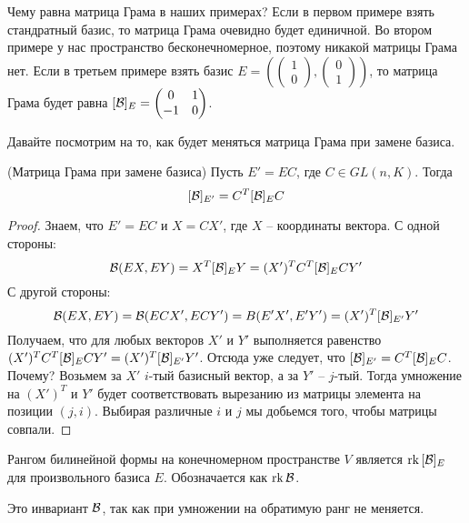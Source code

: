     \vspace*{5mm}
    
    Чему равна матрица Грама в наших примерах?
    Если в первом примере взять стандратный базис, то матрица Грама очевидно будет единичной.
    Во втором примере у нас пространство бесконечномерное, поэтому никакой матрицы Грама нет. 
    Если в третьем примере взять базис $E = \left(\begin{pmatrix}
        1 \\ 0
    \end{pmatrix}, \begin{pmatrix}
        0 \\ 1
    \end{pmatrix} \right)$, то матрица Грама будет равна $[\mathcal{B}]_E = \begin{pmatrix}
        0 & 1 \\
        -1 & 0
    \end{pmatrix}$.
    
    \vspace*{5mm}
    
    Давайте посмотрим на то, как будет меняться матрица Грама при замене базиса.
    
    \begin{theorem}(Матрица Грама при замене базиса)
        Пусть $E' = EC$, где $C \in GL(n, K)$.
        Тогда \[ [\mathcal{B}]_{E'} = C^T[\mathcal{B}]_EC \]
    \end{theorem}
    \begin{proof}
        Знаем, что $E' = EC$ и $X = CX'$, где $X$ -- координаты вектора.
        С одной стороны: \[ \mathcal{B}(EX, EY) = X^T[\mathcal{B}]_EY = (X')^TC^T[\mathcal{B}]_ECY' \]
        \quad С другой стороны: \[ \mathcal{B}(EX, EY) = \mathcal{B}(ECX', ECY') = B(E'X', E'Y') = (X')^T[\mathcal{B}]_{E'}Y' \]
        \quad Получаем, что для любых векторов $X'$ и $Y'$ выполняется равенство $(X')^TC^T[\mathcal{B}]_ECY' = (X')^T[\mathcal{B}]_{E'}Y'$.
        Отсюда уже следует, что $[\mathcal{B}]_{E'} = C^T[\mathcal{B}]_EC$.
        Почему?
        Возьмем за $X'$ $i$-тый базисный вектор, а за $Y'$ -- $j$-тый.
        Тогда умножение на $(X')^T$ и $Y'$ будет соответствовать вырезанию из матрицы элемента на позиции $(j, i)$.
        Выбирая различные $i$ и $j$ мы добьемся того, чтобы матрицы совпали.
    \end{proof}
    
    \vspace*{5mm}
    
    \begin{conj}
        Рангом билинейной формы на конечномерном пространстве $V$ является $\operatorname{rk}{[\mathcal{B}]_E}$ для произвольного базиса $E$.
        Обозначается как $\operatorname{rk}{\mathcal{B}}$.
    \end{conj}
    
    \notice Это инвариант $\mathcal{B}$, так как при умножении на обратимую ранг не меняется.
    